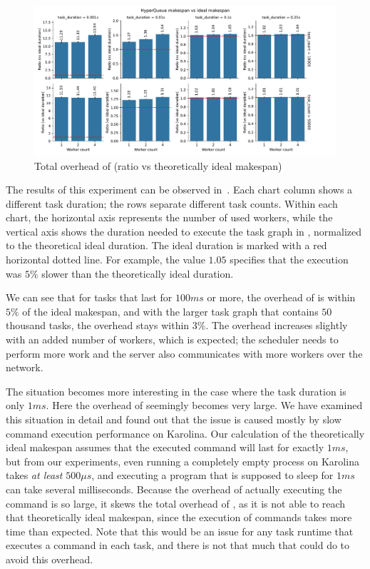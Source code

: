 \begin{figure}[h]
	\centering
	\includegraphics[width=\textwidth]{imgs/hq/charts/total-overhead-vs-ideal}
	\caption{Total overhead of \hyperqueue{} (ratio vs theoretically ideal makespan)}
	\label{fig:hq-overhead-vs-ideal}
\end{figure}

The results of this experiment can be observed in~. Each chart column shows
a different task duration; the rows separate different task counts. Within each chart, the
horizontal axis represents the number of used workers, while the vertical axis shows the duration
needed to execute the task graph in \hyperqueue{}, normalized to the theoretical ideal
duration. The ideal duration is marked with a red horizontal dotted line. For example, the value
$1.05$ specifies that the \hyperqueue{} execution was
$5\%$ slower than the theoretically ideal duration.

We can see that for tasks that last for $100ms$ or more, the overhead of
\hyperqueue{} is within $5\%$ of the ideal makespan, and with the larger
task graph that contains $50$ thousand tasks, the overhead stays within
$3\%$. The overhead increases slightly with an added number of workers, which is
expected; the scheduler needs to perform more work and the server also communicates with more
workers over the network.

The situation becomes more interesting in the case where the task duration is only
$1ms$. Here the overhead of \hyperqueue{} seemingly becomes very large.
We have examined this situation in detail and found out that the issue is caused mostly by slow
command execution performance on Karolina. Our calculation of the theoretically ideal makespan
assumes that the executed command will last for exactly $1ms$, but from our
experiments, even running a completely empty process on Karolina takes \emph{at least}
$500\mu{}s$, and executing a program that is supposed to sleep for
$1ms$ can take several milliseconds. Because the overhead of actually executing
the command is so large, it skews the total overhead of \hyperqueue{}, as it is not able
to reach that theoretically ideal makespan, since the execution of commands takes more time than
expected. Note that this would be an issue for any task runtime that executes a command in each
task, and there is not that much that \hyperqueue{} could do to avoid this overhead.

